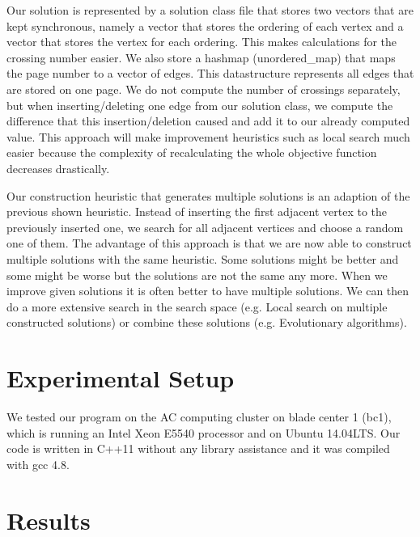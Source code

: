 \documentclass[11pt]{article}
\begin{document}
Our solution is represented by a solution class file that stores two vectors that are kept synchronous, namely a vector that stores the ordering of each vertex and a vector that stores the vertex for each ordering.
This makes calculations for the crossing number easier.
We also store a hashmap (unordered\_map) that maps the page number to a vector of edges. 
This datastructure represents all edges that are stored on one page.
We do not compute the number of crossings separately, but when inserting/deleting one edge from our solution class, we compute the difference that this insertion/deletion caused and add it to our already computed value.
This approach will make improvement heuristics such as local search much easier because the complexity of recalculating the whole objective function decreases drastically.

Our construction heuristic that generates multiple solutions is an adaption of the previous shown heuristic.
Instead of inserting the first adjacent vertex to the previously inserted one, we search for all adjacent vertices and choose a random one of them.
The advantage of this approach is that we are now able to construct multiple solutions with the same heuristic.
Some solutions might be better and some might be worse but the solutions are not the same any more.
When we improve given solutions it is often better to have multiple solutions.
We can then do a more extensive search in the search space (e.g. Local search on multiple constructed solutions) or combine these solutions (e.g. Evolutionary algorithms).

\section{Experimental Setup}
We tested our program on the AC computing cluster on blade center 1 (bc1), which is running an Intel Xeon E5540 processor and on Ubuntu 14.04LTS.
Our code is written in C++11 without any library assistance and it was compiled with gcc 4.8.

\newpage
\section{Results}
\end{document}
